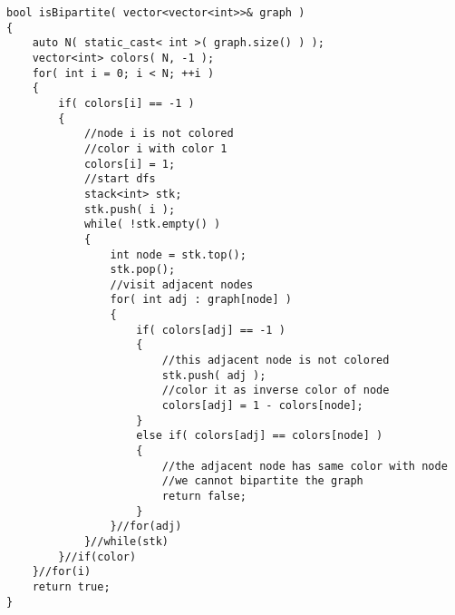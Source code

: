 \setcounter{lstlisting}{0}
\begin{lstlisting}[style=customc, caption={DFS}]
bool isBipartite( vector<vector<int>>& graph )
{
    auto N( static_cast< int >( graph.size() ) );
    vector<int> colors( N, -1 );
    for( int i = 0; i < N; ++i )
    {
        if( colors[i] == -1 )
        {
            //node i is not colored
            //color i with color 1
            colors[i] = 1;
            //start dfs
            stack<int> stk;
            stk.push( i );
            while( !stk.empty() )
            {
                int node = stk.top();
                stk.pop();
                //visit adjacent nodes
                for( int adj : graph[node] )
                {
                    if( colors[adj] == -1 )
                    {
                        //this adjacent node is not colored
                        stk.push( adj );
                        //color it as inverse color of node
                        colors[adj] = 1 - colors[node];
                    }
                    else if( colors[adj] == colors[node] )
                    {
                        //the adjacent node has same color with node
                        //we cannot bipartite the graph
                        return false;
                    }
                }//for(adj)
            }//while(stk)
        }//if(color)
    }//for(i)
    return true;
}
\end{lstlisting}